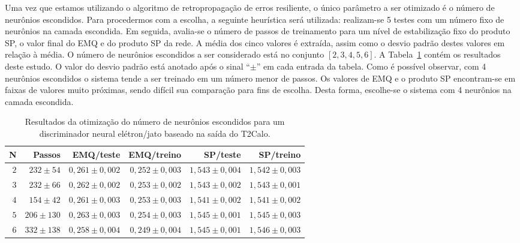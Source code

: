 Uma vez que estamos utilizando o algoritmo de retropropagação de erros
resiliente, o único parâmetro a ser otimizado é o número de neurônios
escondidos. Para procedermos com a escolha, a seguinte heurística será
utilizada: realizam-se 5 testes com um número fixo de neurônios na camada
escondida. Em seguida, avalia-se o número de passos de treinamento para um
nível de estabilização fixo do produto SP, o valor final do EMQ e do produto
SP da rede. A média dos cinco valores é extraída, assim como o desvio padrão
destes valores em relação à média. O número de neurônios escondidos a ser
considerado está no conjunto $[2, 3, 4, 5, 6]$. A
Tabela~\ref{tab:t2calo-neural-hidden-scan} contém os resultados deste
estudo. O valor do desvio padrão está anotado após o sinal ``$\pm$'' em cada
entrada da tabela. Como é possível observar, com 4 neurônios escondidos o
sistema tende a ser treinado em um número menor de passos. Os valores de EMQ e
o produto SP encontram-se em faixas de valores muito próximas, sendo difícil
sua comparação para fins de escolha. Desta forma, escolhe-se o sistema com 4
neurônios na camada escondida.

\begin{table}
\caption{Resultados da otimização do número de neurônios escondidos para um
discriminador neural elétron/jato baseado na saída do T2Calo.}
\label{tab:t2calo-neural-hidden-scan}
\begin{center}
\begin{tabular}{|r|r|r|r|r|r|} \hline
N & Passos & EMQ/teste & EMQ/treino & SP/teste & SP/treino \\
\hline 
$2$ & $232\pm54$ & $0,261\pm0,002$ & $0,252\pm0,003$ & $1,543\pm0,004$ & $1,542\pm0,003$ \\
$3$ & $232\pm66$ & $0,262\pm0,002$ & $0,253\pm0,002$ & $1,543\pm0,002$ & $1,543\pm0,001$ \\
$4$ & $154\pm42$ & $0,261\pm0,003$ & $0,253\pm0,003$ & $1,541\pm0,002$ & $1,541\pm0,002$ \\
$5$ & $206\pm130$ & $0,263\pm0,003$ & $0,254\pm0,003$ & $1,545\pm0,001$ & $1,545\pm0,003$ \\
$6$ & $332\pm138$ & $0,258\pm0,004$ & $0,249\pm0,004$ & $1,545\pm0,001$ & $1,546\pm0,003$ \\
\hline
\end{tabular}
\end{center}
\end{table}

